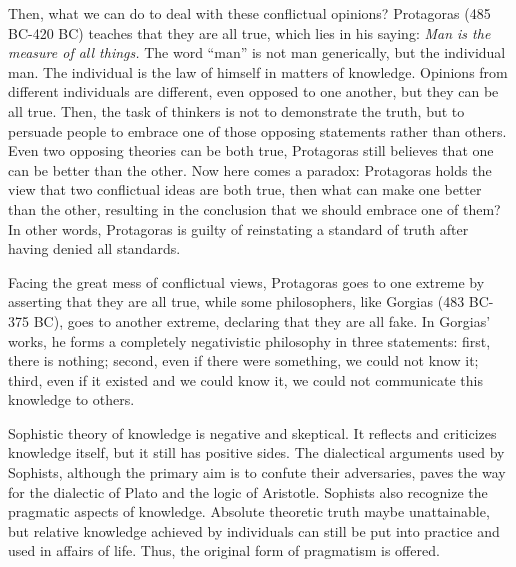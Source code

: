 \documentclass[11pt]{article}
\begin{document}
\begin{sloppypar}
\par

Then, what we can do to deal with these conflictual opinions?
Protagoras (485 BC-420 BC) teaches that they are all true, which lies in his saying: 
\newline
\textit{Man is the measure of all things.} 
\newline
The word “man” is not man generically, but the individual man. 
The individual is the law of himself in matters of knowledge. 
Opinions from different individuals are different, even opposed to one another, but they can be all true. 
Then, the task of thinkers is not to demonstrate the truth, but to persuade people to embrace one of those opposing statements rather than others. 
Even two opposing theories can be both true, Protagoras still believes that one can be better than the other. 
Now here comes a paradox: Protagoras holds the view that two conflictual ideas are both true, then what can make one better than the other, resulting in the conclusion that we should embrace one of them? 
In other words, Protagoras is guilty of reinstating a standard of truth after having denied all standards.

\par

Facing the great mess of conflictual views, Protagoras goes to one extreme by asserting that they are all true, while some philosophers, like Gorgias (483 BC-375 BC), goes to another extreme, declaring that they are all fake. 
In Gorgias’ works, he forms a completely negativistic philosophy in three statements: 
first, there is nothing; 
second, even if there were something, we could not know it; 
third, even if it existed and we could know it, we could not communicate this knowledge to others. 

\par

Sophistic theory of knowledge is negative and skeptical. 
It reflects and criticizes knowledge itself, but it still has positive sides. 
The dialectical arguments used by Sophists, although the primary aim is to confute their adversaries, paves the way for the dialectic of Plato and the logic of Aristotle. 
Sophists also recognize the pragmatic aspects of knowledge. 
Absolute theoretic truth maybe unattainable, but relative knowledge achieved by individuals can still be put into practice and used in affairs of life. 
Thus, the original form of pragmatism is offered.


\end{sloppypar}
\end{document}
